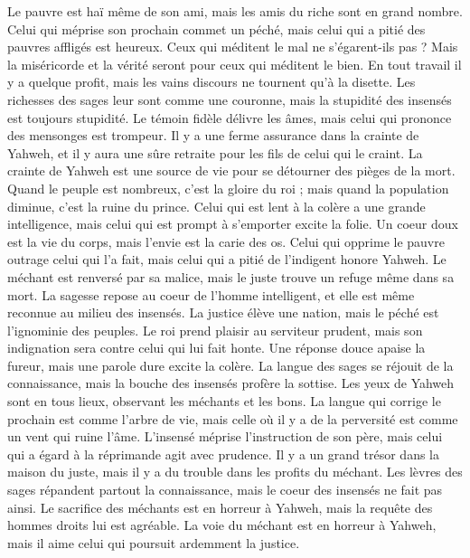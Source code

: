 \begin{multicols}{2}
Le pauvre est haï même de son ami, mais les amis du riche sont en grand nombre.
Celui qui méprise son prochain commet un péché, mais celui qui a pitié des pauvres affligés est heureux.
Ceux qui méditent le mal ne s’égarent-ils pas ? Mais la miséricorde et la vérité seront pour ceux qui méditent le bien.
En tout travail il y a quelque profit, mais les vains discours ne tournent qu'à la disette.
Les richesses des sages leur sont comme une couronne, mais la stupidité des insensés est toujours stupidité.
Le témoin fidèle délivre les âmes, mais celui qui prononce des mensonges est trompeur.
Il y a une ferme assurance dans la crainte de Yahweh, et il y aura une sûre retraite pour les fils de celui qui le craint.
La crainte de Yahweh est une source de vie pour se détourner des pièges de la mort.
Quand le peuple est nombreux, c’est la gloire du roi ; mais quand la population diminue, c'est la ruine du prince.
Celui qui est lent à la colère a une grande intelligence, mais celui qui est prompt à s’emporter excite la folie.
Un coeur doux est la vie du corps, mais l'envie est la carie des os.
Celui qui opprime le pauvre outrage celui qui l'a fait, mais celui qui a pitié de l’indigent honore Yahweh.
Le méchant est renversé par sa malice, mais le juste trouve un refuge même dans sa mort.
La sagesse repose au coeur de l'homme intelligent, et elle est même reconnue au milieu des insensés.
La justice élève une nation, mais le péché est l'ignominie des peuples.
Le roi prend plaisir au serviteur prudent, mais son indignation sera contre celui qui lui fait honte.
\VerseOne{}Une réponse douce apaise la fureur, mais une parole dure excite la colère.
La langue des sages se réjouit de la connaissance, mais la bouche des insensés profère la sottise.
Les yeux de Yahweh sont en tous lieux, observant les méchants et les bons.
La langue qui corrige le prochain est comme l'arbre de vie, mais celle où il y a de la perversité est comme un vent qui ruine l’âme.
L’insensé méprise l'instruction de son père, mais celui qui a égard à la réprimande agit avec prudence.
Il y a un grand trésor dans la maison du juste, mais il y a du trouble dans les profits du méchant.
Les lèvres des sages répandent partout la connaissance, mais le coeur des insensés ne fait pas ainsi.
Le sacrifice des méchants est en horreur à Yahweh, mais la requête des hommes droits lui est agréable.
La voie du méchant est en horreur à Yahweh, mais il aime celui qui poursuit ardemment la justice.

\end{multicols}
